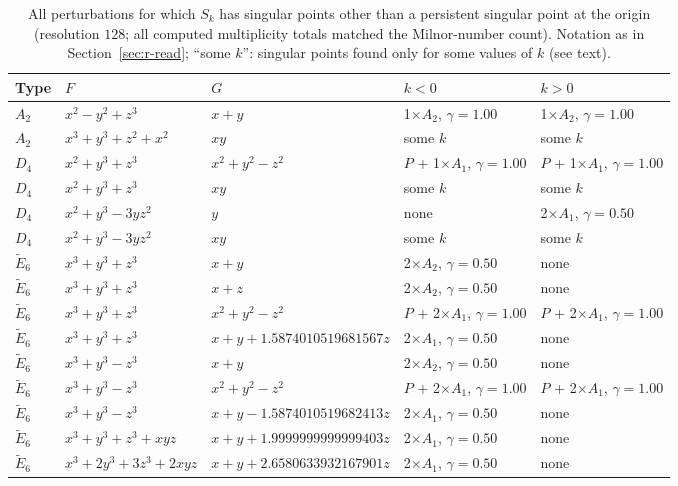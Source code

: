 \documentclass[12pt, a4paper, oneside]{book}
\theoremstyle{plain}
\theoremstyle{definition}
\theoremstyle{remark}
\theoremstyle{definition}
\begin{document}
\begin{table}[!h]
\centering
\footnotesize
\begin{adjustbox}{max width=\textwidth}
\begin{tabular}{l l l l l}
\toprule
Type & $F$ & $G$ & $k<0$ & $k>0$ \\
\midrule
$A_2$ & $x^2-y^2+z^3$ & $x+y$ & 1$\times$$A_2$, $\gamma{=}1.00$ & 1$\times$$A_2$, $\gamma{=}1.00$ \\
$A_2$ & $x^3+y^3+z^2+x^2$ & $xy$ & some $k$ & some $k$ \\
$D_4$ & $x^2+y^3+z^3$ & $x^2+y^2-z^2$ & $P$ + 1$\times$$A_1$, $\gamma{=}1.00$ & $P$ + 1$\times$$A_1$, $\gamma{=}1.00$ \\
$D_4$ & $x^2+y^3+z^3$ & $xy$ & some $k$ & some $k$ \\
$D_4$ & $x^2+y^3-3yz^2$ & $y$ & none & 2$\times$$A_1$, $\gamma{=}0.50$ \\
$D_4$ & $x^2+y^3-3yz^2$ & $xy$ & some $k$ & some $k$ \\
$\tilde E_6$ & $x^3+y^3+z^3$ & $x+y$ & 2$\times$$A_2$, $\gamma{=}0.50$ & none \\
$\tilde E_6$ & $x^3+y^3+z^3$ & $x+z$ & 2$\times$$A_2$, $\gamma{=}0.50$ & none \\
$\tilde E_6$ & $x^3+y^3+z^3$ & $x^2+y^2-z^2$ & $P$ + 2$\times$$A_1$, $\gamma{=}1.00$ & $P$ + 2$\times$$A_1$, $\gamma{=}1.00$ \\
$\tilde E_6$ & $x^3+y^3+z^3$ & $x+y+1.5874010519681567z$ & 2$\times$$A_1$, $\gamma{=}0.50$ & none \\
$\tilde E_6$ & $x^3+y^3-z^3$ & $x+y$ & 2$\times$$A_2$, $\gamma{=}0.50$ & none \\
$\tilde E_6$ & $x^3+y^3-z^3$ & $x^2+y^2-z^2$ & $P$ + 2$\times$$A_1$, $\gamma{=}1.00$ & $P$ + 2$\times$$A_1$, $\gamma{=}1.00$ \\
$\tilde E_6$ & $x^3+y^3-z^3$ & $x+y-1.5874010519682413z$ & 2$\times$$A_1$, $\gamma{=}0.50$ & none \\
$\tilde E_6$ & $x^3+y^3+z^3+xyz$ & $x+y+1.9999999999999403z$ & 2$\times$$A_1$, $\gamma{=}0.50$ & none \\
$\tilde E_6$ & $x^3+2y^3+3z^3+2xyz$ & $x+y+2.6580633932167901z$ & 2$\times$$A_1$, $\gamma{=}0.50$ & none \\
\bottomrule
\end{tabular}
\end{adjustbox}
\caption[Created singular points]{All perturbations for which $S_k$ has singular points other than a persistent singular point at the origin (resolution $128$; all computed multiplicity totals matched the Milnor-number count). Notation as in Section~\ref{sec:r-read}; ``some $k$'': singular points found only for some values of $k$ (see text).}
\label{tab:singular-created}
\end{table}
\end{document}

